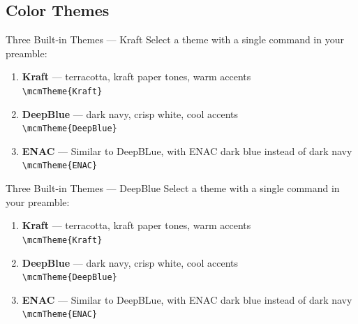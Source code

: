 \documentclass[aspectratio=169]{beamer}
\begin{document}
\subsection{Color Themes}

{
\begin{frame}{Three Built-in Themes — Kraft}
  Select a theme with a single command in your preamble:
  \begin{enumerate}
    \item \textbf{Kraft} — terracotta, kraft paper tones, warm accents\\
      \texttt{\textbackslash mcmTheme\{Kraft\}}
    \item {\color{mcmBlack!30}%
      \textbf{DeepBlue} — dark navy, crisp white, cool accents\\
      \texttt{\textbackslash mcmTheme\{DeepBlue\}}}
    \item {\color{mcmBlack!30}%
      \textbf{ENAC} — Similar to DeepBLue, with ENAC dark blue instead of dark navy\\
      \texttt{\textbackslash mcmTheme\{ENAC\}}}
  \end{enumerate}
\end{frame}
}

{
\begin{frame}{Three Built-in Themes — DeepBlue}
  Select a theme with a single command in your preamble:
  \begin{enumerate}
    \item {\color{mcmBlack!30}%
      \textbf{Kraft} — terracotta, kraft paper tones, warm accents\\
      \texttt{\textbackslash mcmTheme\{Kraft\}}}
    \item \textbf{DeepBlue} — dark navy, crisp white, cool accents\\
      \texttt{\textbackslash mcmTheme\{DeepBlue\}}
    \item {\color{mcmBlack!30}%
      \textbf{ENAC} — Similar to DeepBLue, with ENAC dark blue instead of dark navy\\
      \texttt{\textbackslash mcmTheme\{ENAC\}}}
  \end{enumerate}
\end{frame}
}
\end{document}
